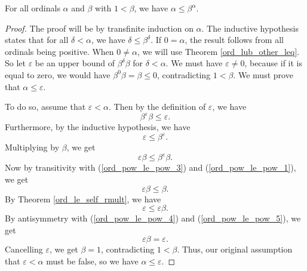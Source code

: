 \documentclass[../../math.tex]{subfiles}
\begin{document}
\begin{theorem} \label{ord_pow_le_pow}
    For all ordinals $\alpha$ and $\beta$ with $1 < \beta$, we have $\alpha
    \leq \beta ^ \alpha$.
\end{theorem}
\begin{proof}
    The proof will be by transfinite induction on $\alpha$.  The inductive
    hypothesis states that for all $\delta < \alpha$, we have $\delta \leq \beta
    ^ \delta$.  If $0 = \alpha$, the result follows from all ordinals being
    positive.  When $0 \neq \alpha$, we will use Theorem
    \ref{ord_lub_other_leq}.  So let $\varepsilon$ be an upper bound of $\beta ^
    \delta \beta$ for $\delta < \alpha$.  We must have $\varepsilon \neq 0$,
    because if it is equal to zero, we would have $\beta^0 \beta = \beta \leq
    0$, contradicting $1 < \beta$.  We must prove that $\alpha \leq
    \varepsilon$.

    To do so, assume that $\varepsilon < \alpha$.  Then by the definition of
    $\varepsilon$, we have
    \begin{equation} \label{ord_pow_le_pow_1}
        \beta ^ \varepsilon \beta \leq \varepsilon.
    \end{equation}
    Furthermore, by the inductive hypothesis, we have
    \begin{equation} \label{ord_pow_le_pow_2}
        \varepsilon \leq \beta ^ \varepsilon.
    \end{equation}
    Multiplying by $\beta$, we get
    \begin{equation} \label{ord_pow_le_pow_3}
        \varepsilon \beta \leq \beta ^ \varepsilon \beta.
    \end{equation}
    Now by transitivity with (\ref{ord_pow_le_pow_3}) and
    (\ref{ord_pow_le_pow_1}), we get
    \begin{equation} \label{ord_pow_le_pow_4}
        \varepsilon \beta \leq \beta.
    \end{equation}
    By Theorem \ref{ord_le_self_rmult}, we have
    \begin{equation} \label{ord_pow_le_pow_5}
        \varepsilon \leq \varepsilon \beta.
    \end{equation}
    By antisymmetry with (\ref{ord_pow_le_pow_4}) and (\ref{ord_pow_le_pow_5}),
    we get
    \[
        \varepsilon \beta = \varepsilon.
    \]
    Cancelling $\varepsilon$, we get $\beta = 1$, contradicting $1 < \beta$.
    Thus, our original assumption that $\varepsilon < \alpha$ must be false, so
    we have $\alpha \leq \varepsilon$.
\end{proof}
\end{document}

